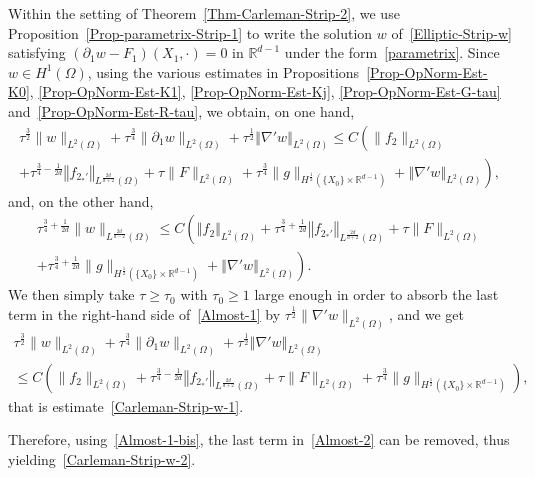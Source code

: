 \documentclass[AHL,Unicode,longabstracts]{cedram}
\newcommand*\R{\mathbb{R}}
\newcommand{\norm}[1]{\left\Vert#1\right\Vert}
\renewcommand{\leq}{\leqslant}
\renewcommand{\geq}{\geqslant}
\begin{document}
Within the setting of Theorem~\ref{Thm-Carleman-Strip-2}, we use Proposition~\ref{Prop-parametrix-Strip-1} to write the solution $w$ of~\eqref{Elliptic-Strip-w} satisfying $(\partial_1 w -F_1)(X_1,\cdot) = 0$ in $\R^{d-1}$ under the form~\eqref{parametrix}. Since $w \in H^1(\Omega)$, using the various estimates in Propositions~\ref{Prop-OpNorm-Est-K0}, \ref{Prop-OpNorm-Est-K1}, \ref{Prop-OpNorm-Est-Kj}, \ref{Prop-OpNorm-Est-G-tau} and~\ref{Prop-OpNorm-Est-R-tau}, we obtain, on one hand,
\begin{multline}\label{Almost-1}
\tau^{\frac{3}{2}} \| w\|_{L^2(\Omega)} +
\tau^{\frac{3}{4}} \| \partial_1 w\|_{L^2(\Omega)} +
\tau^{\frac{1}{2}} \norm{\nabla' w}_{L^2(\Omega)}
\leq C\left(
\| f_2 \|_{L^2(\Omega)}
\right.
\\
\left. +
\tau^{\frac{3}{4}- \frac{1}{2d}} \norm{f_{2_*'}}_{L^{\frac{2d}{d+2}}(\Omega)} +
\tau \| F \|_{L^2(\Omega)}+
\tau^{\frac{3}{4}} \| g \|_{H^{\frac{1}{2}}
\left(\{X_0\} \times \R^{d-1}\right)} +
\norm{\nabla' w}_{L^2(\Omega)}
\right),
\end{multline}
and, on the other hand,
\begin{multline}\label{Almost-2}
\tau^{\frac{3}{4}+\frac{1}{2d}} \| w\|_{L^{\frac{2d}{d-2}}(\Omega)}
\leq C\left(
\norm{f_2}_{L^2(\Omega)} +
\tau^{\frac{3}{4}+\frac{1}{2d}} \norm{f_{2_*'}}_{L^{\frac{2d}{d+2}}(\Omega)} +
\tau \| F \|_{L^2(\Omega)}
\right.
\\
\left.+
\tau^{\frac{3}{4}+ \frac{1}{2d}} \| g \|_{H^{\frac{1}{2}}\left(\{X_0\} \times \R^{d-1}\right)} +
\norm{\nabla' w}_{L^2(\Omega)}
\right).
\end{multline}
We then simply take $\tau \geq \tau_0$ with $\tau_0 \geq 1$ large enough in order to absorb the last term in the right-hand side of~\eqref{Almost-1} by $\tau^{\frac{1}{2}} \|\nabla' w\|_{L^2(\Omega)}$, and we get
\begin{multline}\label{Almost-1-bis}
\tau^{\frac{3}{2}} \| w\|_{L^2(\Omega)} +
\tau^{\frac{3}{4}} \| \partial_1 w\|_{L^2(\Omega)} +
\tau^{\frac{1}{2}} \norm{\nabla' w}_{L^2(\Omega)}
\\
\leq C\left(
\| f_2 \|_{L^2(\Omega)} +
\tau^{\frac{3}{4}- \frac{1}{2d}} \norm{f_{2_*'}}_{L^{\frac{2d}{d+2}}(\Omega)} +
\tau \| F \|_{L^2(\Omega)} +
\tau^{\frac{3}{4}} \| g \|_{H^{\frac{1}{2}}
\left(\{X_0\} \times \R^{d-1}\right)}
\right),
\end{multline}
that is estimate~\eqref{Carleman-Strip-w-1}.

Therefore, using~\eqref{Almost-1-bis}, the last term in~\eqref{Almost-2} can be removed, thus yielding~\eqref{Carleman-Strip-w-2}.
\end{document}
